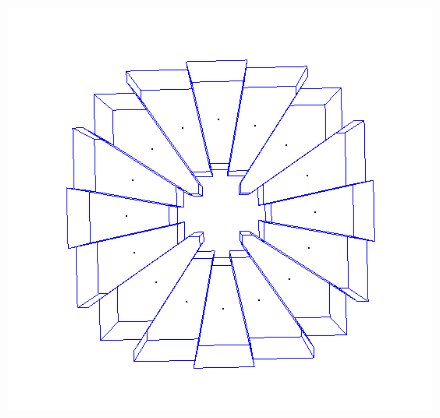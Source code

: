 \documentclass{beamer}
\begin{document}
\begin{frame}
    \begin{figure}
        \centering
        \includegraphics[scale=0.2]{img/circle-cube-inter}
    \end{figure}
\end{frame}
\end{document}

